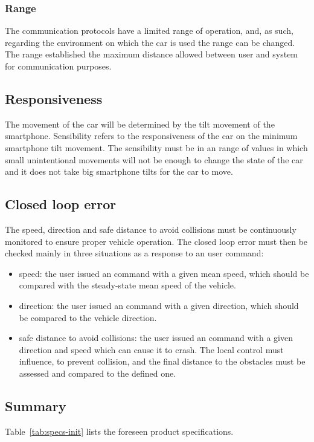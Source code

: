 \subsubsection{Range}%
\label{sec:org447a205}
The communication protocols have a limited range of operation, and, as such, regarding the environment on which the car is used the range can be changed.
The range established the maximum distance allowed between user and system for communication purposes.
\subsection{Responsiveness}%
\label{sec:org622e63a}
The movement of the car will be determined by the tilt movement of the smartphone. Sensibility refers to the responsiveness of the car on the minimum smartphone tilt movement. The sensibility must be in an range of values in which small unintentional movements will not be enough to change the state of the car and it does not take big smartphone tilts for the car to move.
\subsection{Closed loop error}%
\label{sec:closed-loop-error-specs}
The speed, direction and safe distance to avoid collisions must be continuously monitored to ensure proper vehicle operation. The closed loop error must then be checked mainly in three situations as a response to an user command:
\begin{itemize}
\item speed: the user issued an command with a given mean speed, which should be compared with the steady-state mean speed of the vehicle.
\item direction: the user issued an command with a given direction, which should be compared to the vehicle direction.
\item safe distance to avoid collisions: the user issued an command with a given direction and speed which can cause it to crash. The local control must influence, to prevent collision, and the final distance to the obstacles must be assessed and compared to the defined one.
\end{itemize}
\subsection{Summary}%
\label{sec:org1f95256}
Table~\ref{tab:specs-init} lists the foreseen product specifications.

